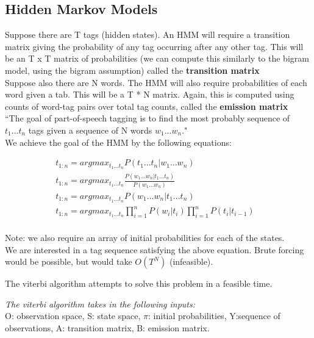 \documentclass[]{article}
\begin{document}
	\subsection{Hidden Markov Models}
	Suppose there are T tags (hidden states). An HMM will require a transition matrix giving the probability of any tag occurring after any other tag. This will be an T x T matrix of probabilities (we can compute this similarly to the bigram model, using the bigram assumption) called the \textbf{transition matrix}
	\\
	Suppose also there are N words. The HMM will also require probabilities of each word given a tab. This will be a T * N matrix. Again, this is computed using counts of word-tag pairs over total tag counts, called the \textbf{emission matrix}
	\\
	``The goal of part-of-speech tagging is to find the most probably sequence of $t_1...t_n$ tags given a sequence of N words $w_1...w_n$."  
	\\
	We achieve the goal of the HMM by the following equations:
	
	\begin{align}	
		t_{1:n} = argmax_{t_1...t_n} P(t_1...t_n | w_1...w_n) &\tag*{max prb tags given words} \\	
		t_{1:n} = argmax_{t_1...t_n} \frac{P(w_1...w_n | t_1...t_n)}{P(w_1...w_n)} &\tag*{by bayes rule} \\	
		t_{1:n} = argmax_{t_1...t_n} P(w_1...w_n | t_1...t_n) &\tag*{since argmax, can discard denom} \\	
		t_{1:n} = argmax_{t_1...t_n} \prod_{i=1}^n P(w_i|t_i) \prod_{i=1}^n P(t_i|t_{i-1}) &\tag*{by the HMM assumptions} \\	
	\end{align}
	
	Note: we also require an array of initial probabilities for each of the states. \\
	
	We are interested in a tag sequence satisfying the above equation. Brute forcing would be possible, but would take $O(T^N)$ (infeasible). 
	
	The viterbi algorithm attempts to solve this problem in a feasible time.
	
	\textit{The viterbi algorithm takes in the following inputs:} \\ O: observation space, S: state space, $\pi$: initial probabilities, Y:sequence of observations, A: transition matrix, B: emission matrix. 
	
\end{document}

